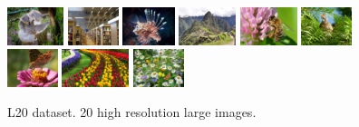 \documentclass[10pt,twocolumn,letterpaper]{article}
\begin{document}
\begin{figure}[th!]
{\includegraphics[height=1.1cm]{img12.png}
\includegraphics[height=1.1cm]{img13.png}
\includegraphics[height=1.1cm]{img14.png}
\includegraphics[height=1.1cm]{img15.png}
\includegraphics[height=1.1cm]{img16.png}
\includegraphics[height=1.1cm]{img17.png}
\includegraphics[height=1.1cm]{img18.png}
\includegraphics[height=1.1cm]{img19.png}
\includegraphics[height=1.1cm]{img20.png}
}
\caption{L20 dataset. 20 high resolution large images.}
\label{fig:L20}
\end{figure}
\end{document}
